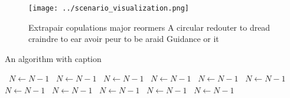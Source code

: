 \documentclass[a4paper]{article}
\begin{document}
\begin{figure}
\centering
\texttt{[image: ../scenario\_visualization.png]}
\caption{Extrapair copulations major reormers A circular redouter to dread craindre to ear avoir peur to be araid Guidance or it
}
\end{figure}
 
\begin{algorithm}
\caption{An algorithm with caption}
\begin{algorithmic}
\    \State $N \gets N - 1$
\    \State $N \gets N - 1$
\    \State $N \gets N - 1$
\    \State $N \gets N - 1$
\    \State $N \gets N - 1$
\    \State $N \gets N - 1$
\    \State $N \gets N - 1$
\    \State $N \gets N - 1$
\    \State $N \gets N - 1$
\    \State $N \gets N - 1$
\    \State $N \gets N - 1$
\EndWhile
\end{algorithmic}
\end{algorithm}
\end{document}
